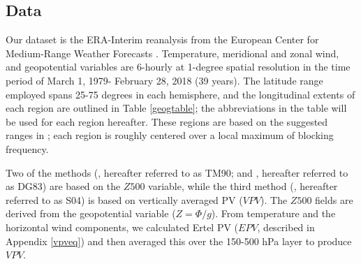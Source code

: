 \documentclass[smallextended]{svjour3}       %
\numberwithin{equation}{section}
\begin{document}
\subsection{Data}\label{datasec}


Our dataset is the ERA-Interim reanalysis from the European Center for Medium-Range Weather Forecasts \citep{dee_era-interim_2011}. Temperature, meridional and zonal wind, and geopotential variables are 6-hourly at 1-degree spatial resolution in the time period of March 1, 1979- February 28, 2018 (39 years). The latitude range employed spans 25-75 degrees in each hemisphere, and the longitudinal extents of each region are outlined in Table \ref{geogtable}; the abbreviations in the table will be used for each region hereafter. These regions are based on the suggested ranges in \cite{wiedenmann_climatology_2002}; each region is roughly centered over a local maximum of blocking frequency. 

\begin{table}
\caption{Longitudinal extents of study regions;  each region has a latitudinal extent of 25-75 degrees in their respective hemispheres. The regions can be seen outlined on the maps in Figures \ref{avg}-\ref{blockdens}. The two-letter abbreviations will be used to refer to these regions throughout the paper.}
\label{geogtable}
\end{table}


Two of the methods (\cite{tibaldi_operational_1990}, hereafter referred to as TM90; and \cite{dole_persistent_1983}, hereafter referred to as DG83) are based on the $Z500$ variable, while the third method (\cite{schwierz_perspicacious_2004}, hereafter referred to as S04) is based on vertically averaged PV ($VPV$). The $Z500$ fields are derived from the geopotential variable ($Z = \Phi / g$). From temperature and the horizontal wind components, we calculated Ertel PV ($EPV$, described in Appendix \ref{vpveq}) and then averaged this over the 150-500 hPa layer to produce $VPV$.  
\end{document}
